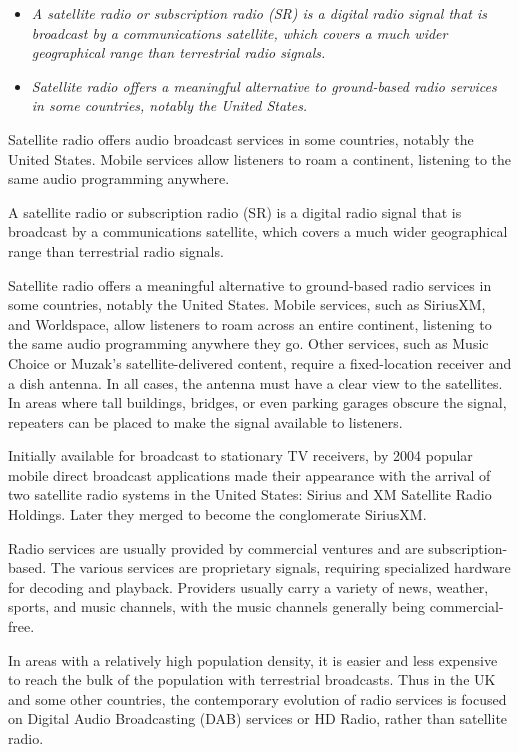 \begin{itemize}
\item
  \emph{A satellite radio or subscription radio (SR) is a digital radio
  signal that is broadcast by a communications satellite, which covers a
  much wider geographical range than terrestrial radio signals.}
\item
  \emph{Satellite radio offers a meaningful alternative to ground-based
  radio services in some countries, notably the United States.}
\end{itemize}

Satellite radio offers audio broadcast services in some countries,
notably the United States. Mobile services allow listeners to roam a
continent, listening to the same audio programming anywhere.

A satellite radio or subscription radio (SR) is a digital radio signal
that is broadcast by a communications satellite, which covers a much
wider geographical range than terrestrial radio signals.

Satellite radio offers a meaningful alternative to ground-based radio
services in some countries, notably the United States. Mobile services,
such as SiriusXM, and Worldspace, allow listeners to roam across an
entire continent, listening to the same audio programming anywhere they
go. Other services, such as Music Choice or Muzak's satellite-delivered
content, require a fixed-location receiver and a dish antenna. In all
cases, the antenna must have a clear view to the satellites. In areas
where tall buildings, bridges, or even parking garages obscure the
signal, repeaters can be placed to make the signal available to
listeners.

Initially available for broadcast to stationary TV receivers, by 2004
popular mobile direct broadcast applications made their appearance with
the arrival of two satellite radio systems in the United States: Sirius
and XM Satellite Radio Holdings. Later they merged to become the
conglomerate SiriusXM.

Radio services are usually provided by commercial ventures and are
subscription-based. The various services are proprietary signals,
requiring specialized hardware for decoding and playback. Providers
usually carry a variety of news, weather, sports, and music channels,
with the music channels generally being commercial-free.

In areas with a relatively high population density, it is easier and
less expensive to reach the bulk of the population with terrestrial
broadcasts. Thus in the UK and some other countries, the contemporary
evolution of radio services is focused on Digital Audio Broadcasting
(DAB) services or HD Radio, rather than satellite radio.

